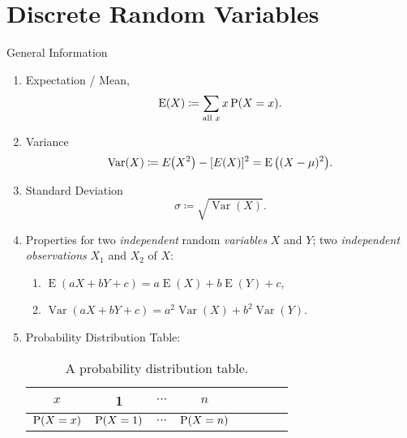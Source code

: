 \documentclass[oneside]{book}
\begin{document}
\chapter{Discrete Random Variables}
\begin{stbox}{General Information}
  \begin{enumerate}
    \item Expectation / Mean, 
    \[\operatorname{E}(X)\coloneq \sum_{\text{all } x}{x\operatorname{P}(X=x)}.\]
    \item Variance 
    \[\operatorname{Var}(X)\coloneq E\hspace{-0.7mm}\left(X^2\right)-[E(X)]^2=\operatorname{E}{\left( (X-\mu)^2 \right)}.\]
    \item Standard Deviation
    \[\sigma\coloneq \sqrt{\operatorname{Var}(X)}.\]
    \item Properties for two \emph{independent} random \emph{variables} \(X\) and \(Y\); two \emph{independent observations} \(X_1\) and \(X_2\) of \(X\):
    \begin{enumerate}
      \item \(\operatorname{E}(aX+bY+c)=a\operatorname{E}(X)+b\operatorname{E}(Y)+c\),
      \item \(\operatorname{Var}(aX+bY+c)=a^2\operatorname{Var}(X)+b^2\operatorname{Var}(Y)\).
    \end{enumerate}
    \item Probability Distribution Table:
    \begin{table}[H]
      \centering
      \begin{tabular}{|Sc|Sc|Sc|Sc|}
        \hline
        \(x\) & 1 & \(\cdots\) & \(n\)\\
        \hline
        \(\operatorname{P}(X=x)\) & \(\operatorname{P}(X=1)\) & \(\cdots\) & \(\operatorname{P}(X=n)\)\\
        \hline
      \end{tabular}
      \caption{A probability distribution table.}
      \label{table:a-probability-distribution-table}
    \end{table}
  \end{enumerate}
\end{stbox}
\end{document}
